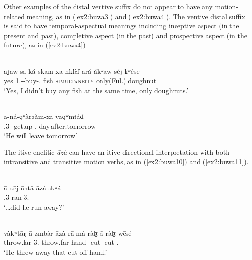 Other examples of the distal ventive suffix do not appear to have any motion-related meaning, as in (\ref{ex2:buwa3}) and (\ref{ex2:buwa4}). The ventive distal suffix is said to have temporal-aspectual meanings including inceptive aspect (in the present and past), completive aspect (in the past) and prospective aspect (in the future), as in (\ref{ex2:buwa4}) \citep[375--376]{viljoenGrammaticalDescriptionBuwal2013}.

\ea\label{ex2:buwa3}
 \\
\gll ājāw sā-ká-skām-xā nklèf ārá ákʷāw séj kʷésē	 \\
yes 1.--buy-. fish \textsc{simultaneity}  only(Ful.) doughnut	\\
\glt `Yes, I didn’t buy any fish at the same time, only doughnuts.'

\ex\label{ex2:buwa4}
 \\
\gll ā-ná-ɡʷàrzàm-xā	vāɡʷmtáɗ \\ 
.3--get.up-.	day.after.tomorrow \\
\glt `He will leave tomorrow.'
\z 

The itive enclitic \textit{āzà} can have an itive directional interpretation with both intransitive and transitive motion verbs, as in (\ref{ex2:buwa10}) and (\ref{ex2:buwa11}).

\ea\label{ex2:buwa10}
 \\
\gll ā-xēj āntā āzà skʷá	\\
.3-ran 3.  	\\
\glt `…did he run away?'

\ex\label{ex2:buwa11}
 \\
\gll  vàkʷtāŋ ā-zmbàr āzà rā má-ràɮ-ā-ràɮ wēsé	\\
throw.far 3.-throw.far  hand -cut--cut .		\\
\glt `He threw away that cut off hand.'
\z

